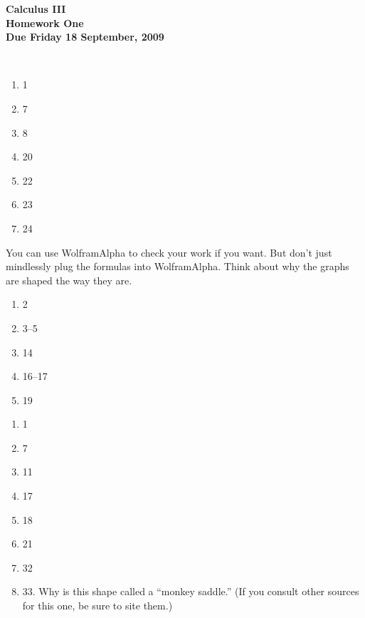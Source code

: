 \documentclass[12pt]{article}
\begin{document}
\pagestyle{empty}
 
\begin{center}
{\large {\bf Calculus III}}\\
\medskip
{\large {\bf Homework One}}\\
\medskip
{ {\bf Due Friday 18 September, 2009}}\\
\end{center}

\hspace{2mm}\\


\begin{enumerate}
\setlength{\itemsep}{-1mm}
  \item 1
  \item 7
  \item 8
  \item 20
  \item 22
  \item 23
  \item 24

\end{enumerate}


 You can use WolframAlpha to check your
work if you want. But don't just mindlessly plug the formulas into
WolframAlpha. Think about why the graphs are shaped the way they are.  

\begin{enumerate}
\setlength{\itemsep}{-1mm}
  \item 2
  \item 3--5
  \item 14
  \item 16--17
  \item 19

\end{enumerate}




\begin{enumerate}
\setlength{\itemsep}{-1mm}
  \item 1
  \item 7
  \item 11
  \item 17
  \item 18
  \item 21
  \item 32
  \item 33.  Why is this shape called a ``monkey saddle.''  (If you
    consult other sources for this one, be sure to site them.)

\end{enumerate}
\end{document}
